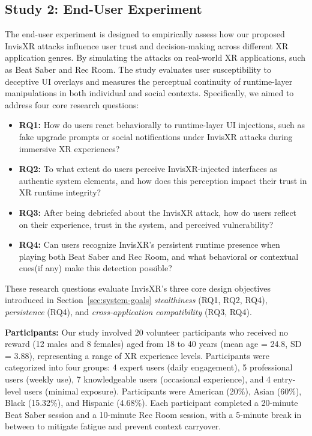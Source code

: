\documentclass[letterpaper,twocolumn,10pt]{article}
\begin{document}
\subsection{Study 2: End-User Experiment}
\label{sec:end-user-experiment}
The end-user experiment is designed to empirically assess how our proposed InvisXR attacks influence user trust and decision-making across different XR application genres. By simulating the attacks on real-world XR applications, such as Beat Saber and Rec Room. The study evaluates user susceptibility to deceptive UI overlays and measures the perceptual continuity of runtime-layer manipulations in both individual and social contexts. Specifically, we aimed to address four core research questions:
\begin{itemize}
    \item \textbf{RQ1:}  How do users react behaviorally to runtime-layer UI injections, such as fake upgrade prompts or social notifications under InvisXR attacks during immersive XR experiences?
    
    \item \textbf{RQ2:} To what extent do users perceive InvisXR-injected interfaces as authentic system elements, and how does this perception impact their trust in XR runtime integrity?

    \item \textbf{RQ3:}  After being debriefed about the InvisXR attack, how do users reflect on their experience, trust in the system, and perceived vulnerability?
    
    \item \textbf{RQ4:} Can users recognize InvisXR’s persistent runtime presence when playing both Beat Saber and Rec Room, and what behavioral or contextual cues(if any) make this detection possible?
\end{itemize}

These research questions evaluate InvisXR's three core design objectives introduced in Section~\ref{sec:system-goals} \emph{stealthiness} (RQ1, RQ2, RQ4), \emph{persistence} (RQ4), and \emph{cross-application compatibility} (RQ3, RQ4).


\textbf{Participants:} Our study involved 20 volunteer participants who received no reward (12 males and 8 females) aged from 18 to 40 years (mean age = 24.8, SD = 3.88), representing a range of XR experience levels. Participants were categorized into four groups: 4 expert users (daily engagement), 5 professional users (weekly use), 7 knowledgeable users (occasional experience), and 4 entry-level users (minimal exposure). Participants were American (20\%), Asian (60\%), Black (15.32\%), and Hispanic (4.68\%). Each participant completed a 20-minute Beat Saber session and a 10-minute Rec Room session, with a 5-minute break in between to mitigate fatigue and prevent context carryover. 
\end{document}
